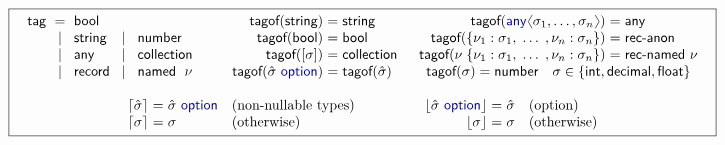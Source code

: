 \documentclass[10pt,preprint,blind,clearpagebib]{sigplanconf}
\newcommand{\langl}{\begin{picture}(4.5,7)
\put(1.1,2.5){\rotatebox{60}{\line(1,0){5.5}}}
\put(1.1,2.5){\rotatebox{300}{\line(1,0){5.5}}}
\end{picture}}
\newcommand{\rangl}{\begin{picture}(4.5,7)
\put(.9,2.5){\rotatebox{120}{\line(1,0){5.5}}}
\put(.9,2.5){\rotatebox{240}{\line(1,0){5.5}}}
\end{picture}}
\newcommand{\kvd}[1]{\textnormal{\textcolor{kvdclr}{\sffamily #1}}}
\newcommand{\ident}[1]{\textnormal{\sffamily #1}}
\newcommand{\lsep}[0]{\;\; | \;\;}
\newcommand{\narrow}[1]{\hspace{-0.7em} #1 \hspace{-0.7em}}
\newcommand{\tytag}{\ident{tag}}
\newcommand{\dropopt}[1]{\lfloor#1\rfloor}
\newcommand{\addopt}[1]{\lceil#1\rceil}
\newcommand{\tytagof}{\ident{tagof}}
\begin{document}
\begin{figure}[t]
\noindent
\begin{equation*}
\boxed{
\begin{array}{c}
\begin{array}{rclcl}
 \tytag &\narrow{=}& \ident{bool} \\
        &\narrow{\lsep}& \ident{string} &\narrow{\lsep}& \ident{number}  \\
        &\narrow{\lsep}& \ident{any}  &\narrow{\lsep}& \ident{collection} \\
        &\narrow{\lsep}& \ident{record} &\narrow{\lsep}& \ident{named}\;~\nu 
\end{array}
%
\quad\;\;\;
%
\begin{array}{rcl}
 \tytagof(\ident{string}) &\narrow{=}& \ident{string}\\
 \tytagof(\ident{bool}) &\narrow{=}& \ident{bool}\\
 \tytagof([\sigma]) &\narrow{=}& \ident{collection}\\
 \tytagof(\hat{\sigma}~\kvd{option}) &\narrow{=}& \tytagof(\hat{\sigma})
\end{array}
%
\;\;
%
\begin{array}{rcl}
 \tytagof(\kvd{any}\langl\sigma_1, \ldots, \sigma_n\rangl) &\narrow{=}& \ident{any}\\
 \tytagof(\{ \nu_1 : \sigma_1, \; \ldots \; , \nu_n : \sigma_n \}) &\narrow{=}& \ident{rec-anon}\\
 \tytagof(\nu\; \{ \nu_1 : \sigma_1, \; \ldots \; , \nu_n : \sigma_n \}) &\narrow{=}& \ident{rec-named}~\nu \\
 \multicolumn{3}{c}{ \tytagof(\sigma) = \ident{number}\quad \sigma \in\{ \ident{int},\ident{decimal},\ident{float} \}  } 
\end{array}
%
\\[3em]
%
\begin{array}{rcll}
 \addopt{\hat{\sigma}} &\narrow{=}& \hat{\sigma}~\kvd{option} &(\textnormal{non-nullable types})\\
 \addopt{\sigma} &\narrow{=}& \sigma &(\textnormal{otherwise})
\end{array}
\qquad\qquad
\begin{array}{rcll}
 \dropopt{\hat{\sigma}~\kvd{option}} &\narrow{=}& \hat{\sigma} &(\textnormal{option})\\
 \dropopt{\sigma} &\narrow{=}& \sigma &(\textnormal{otherwise})
\end{array}
\end{array}
}
\end{equation*}


\end{figure}
\end{document}
